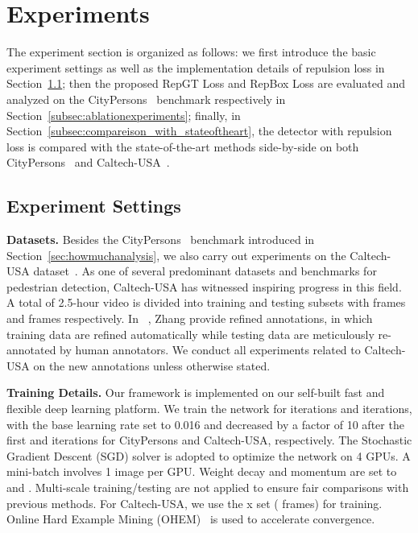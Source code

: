 \documentclass[10pt,twocolumn,letterpaper]{article}
\newcommand{\myparagraph}[1]{{\vspace{0.5em} \noindent \bf #1}}
\begin{document}
\section{Experiments}
\label{sec:exp}
The experiment section is organized as follows: we first introduce the basic experiment settings as well as the implementation details of repulsion loss in Section~\ref{subsec:implementation_details}; then the proposed RepGT Loss and RepBox Loss are evaluated and analyzed on the CityPersons~\cite{zhang2017citypersons} benchmark respectively in Section~\ref{subsec:ablationexperiments}; finally, in Section~\ref{subsec:compareison_with_stateoftheart}, the detector with repulsion loss is compared with the state-of-the-art methods side-by-side on both CityPersons~\cite{zhang2017citypersons} and Caltech-USA~\cite{dollar2009pedestrian}.

\subsection{Experiment Settings}
\label{subsec:implementation_details}
\myparagraph{Datasets.} Besides the CityPersons~\cite{zhang2017citypersons} benchmark introduced in Section~\ref{sec:howmuchanalysis}, we also carry out experiments on the Caltech-USA dataset~\cite{dollar2009pedestrian}. As one of several predominant datasets and benchmarks for pedestrian detection, Caltech-USA has witnessed inspiring progress in this field.
A total of 2.5-hour video is divided into training and testing subsets with  frames and  frames respectively. In ~\cite{zhang2016far}, Zhang \etal provide refined annotations, in which training data are refined automatically while testing data are meticulously re-annotated by human annotators. We conduct all experiments related to Caltech-USA on the new annotations unless otherwise stated.

\myparagraph{Training Details.} Our framework is implemented on our self-built fast and flexible deep learning platform. We train the network for  iterations and  iterations, with the base learning rate set to 0.016 and decreased by a factor of 10 after the first  and  iterations for CityPersons and Caltech-USA, respectively. The Stochastic Gradient Descent (SGD) solver is adopted to optimize the network on 4 GPUs. A mini-batch involves 1 image per GPU. Weight decay and momentum are set to  and . Multi-scale training/testing are not applied to ensure fair comparisons with previous methods. For Caltech-USA, we use the x set ( frames) for training. Online Hard Example Mining (OHEM)~\cite{shrivastava2016training} is used to accelerate convergence.
\end{document}
